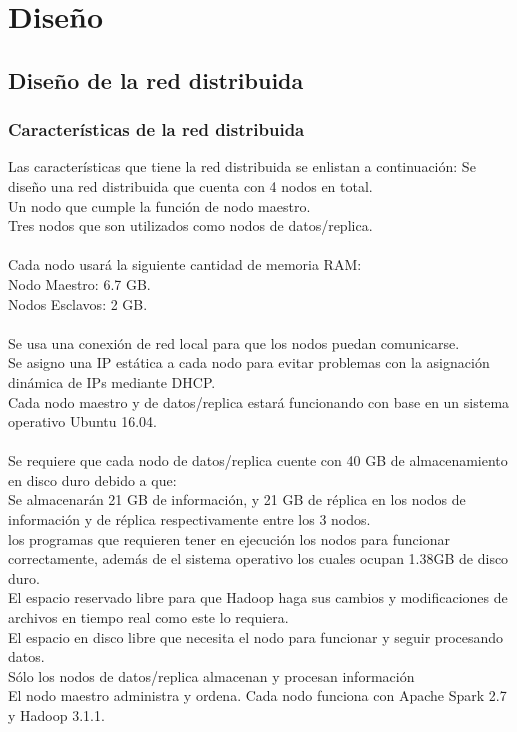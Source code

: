 \section{Diseño}
\subsection{Diseño de la red distribuida} \label{seccion2}
\subsubsection{Características de la red distribuida}
Las características que tiene la red distribuida se enlistan a continuación:
Se diseño una red distribuida que cuenta con 4 nodos en total.
\\ Un nodo que cumple la función de nodo maestro.
\\ Tres nodos que son utilizados como nodos de datos/replica.
\\ \\
Cada nodo usará la siguiente cantidad de memoria RAM:
\\ Nodo Maestro: 6.7 GB.
\\ Nodos Esclavos: 2 GB.
\\ 
\\ Se usa una conexión de red local para que los nodos puedan comunicarse.
\\ Se asigno una IP estática a cada nodo para evitar problemas con la asignación dinámica de IPs mediante DHCP.
\\ Cada nodo maestro y de datos/replica estará funcionando con base en un sistema operativo Ubuntu 16.04.
\\ 
\\ Se requiere que cada nodo de datos/replica cuente con 40 GB de almacenamiento en disco duro debido a que:
\\ Se almacenarán 21 GB de información, y 21 GB de réplica en los nodos de información y de réplica respectivamente entre los 3 nodos. 
\\ los programas que requieren tener en ejecución los nodos para funcionar correctamente, además de el sistema operativo los cuales ocupan 1.38GB de disco duro.
\\ El espacio reservado libre para que Hadoop haga sus cambios y modificaciones de archivos en tiempo real como este lo requiera.
\\ El espacio en disco libre que necesita el nodo para funcionar y seguir procesando datos.
\\
Sólo los nodos de datos/replica almacenan y procesan información 
\\ El nodo maestro administra y ordena.
Cada nodo funciona con Apache Spark 2.7 y Hadoop 3.1.1.
